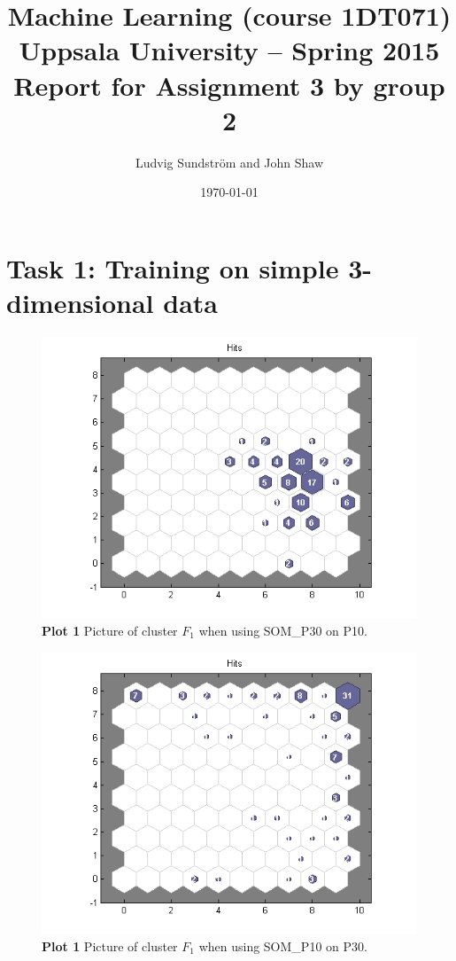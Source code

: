 \documentclass[a4paper]{article}
\title{Machine Learning (course 1DT071)
Uppsala University – Spring 2015
Report for Assignment 3 by group 2}
\author{Ludvig Sundstr\"{o}m and John Shaw}
\date{\today}
\begin{document}
\maketitle

\section*{Task 1: Training on simple 3-dimensional data}

\begin{figure}[H] %
	\includegraphics[]{q1_somP30onP10.png}
	\caption{\label{fig:plot1P10onP30}\textbf{Plot 1} Picture of cluster $F_1$ when using SOM\_P30 on P10.}
\end{figure}

\begin{figure}[H] %
	\includegraphics[]{q1_somP10onP30.png}
	\caption{\label{fig:plot1P10onP30}\textbf{Plot 1} Picture of cluster $F_1$ when using SOM\_P10 on P30.}
\end{figure}
\end{document}
